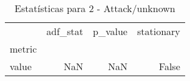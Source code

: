 \begin{table}[htbp]
\caption{Estatísticas para 2 - Attack/unknown}
\label{tab:2_-_attack_unknown_adf_test}
\begin{tabular}{lrrr}
\toprule
 & adf_stat & p_value & stationary \\
metric &  &  &  \\
\midrule
value & NaN & NaN & False \\
\bottomrule
\end{tabular}
\end{table}
